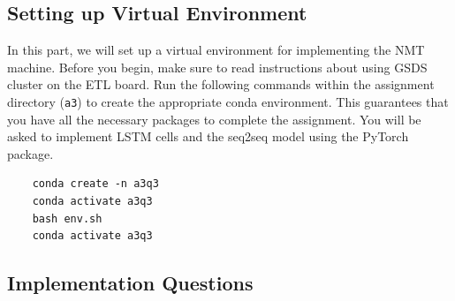 \documentclass{assignment format}
\begin{document}
\subsection{Setting up Virtual Environment}
In this part, we will set up a virtual environment for implementing the NMT machine. Before you begin, make sure to read instructions about using GSDS cluster on the ETL board. Run the following commands within the assignment directory (\texttt{a3}) to create the appropriate conda environment. This guarantees that you have all the necessary packages to complete the assignment. You will be asked to implement LSTM cells and the seq2seq model using the PyTorch package. 
\begin{verbatim}
    conda create -n a3q3
    conda activate a3q3
    bash env.sh
    conda activate a3q3
\end{verbatim}


\subsection{Implementation Questions}
\end{document}
